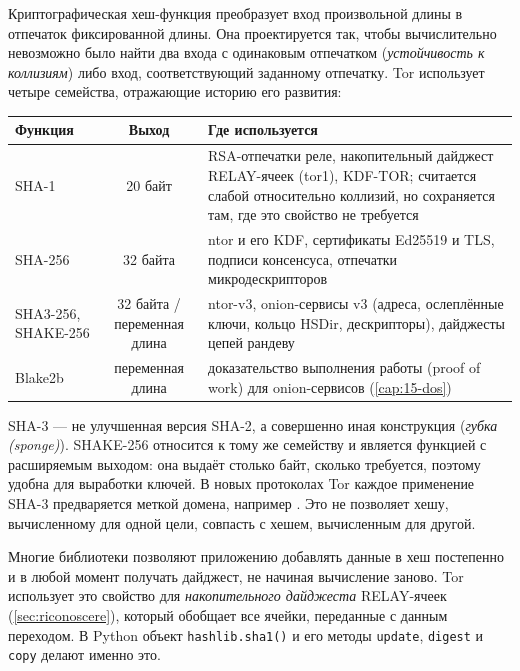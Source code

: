 Криптографическая хеш-функция преобразует вход произвольной длины в отпечаток фиксированной длины. Она проектируется так, чтобы вычислительно невозможно было найти два входа с одинаковым отпечатком (\emph{устойчивость к коллизиям}) либо вход, соответствующий заданному отпечатку. Tor использует четыре семейства, отражающие историю его развития:
\begin{center}\small
\begin{tabularx}{\textwidth}{@{}l c >{\raggedright\arraybackslash}X@{}}
\toprule
Функция & Выход & Где используется \\
\midrule
SHA-1 & 20 байт & RSA-отпечатки реле, накопительный дайджест RELAY-ячеек (tor1), KDF-TOR; считается слабой относительно коллизий, но сохраняется там, где это свойство не требуется \\
SHA-256 & 32 байта & ntor и его KDF, сертификаты Ed25519 и TLS, подписи консенсуса, отпечатки микродескрипторов \\
SHA3-256, SHAKE-256 & 32 байта / переменная длина & ntor-v3, onion-сервисы v3 (адреса, ослеплённые ключи, кольцо HSDir, дескрипторы), дайджесты цепей рандеву \\
Blake2b & переменная длина & доказательство выполнения работы (proof of work) для onion-сервисов (\cref{cap:15-dos}) \\
\bottomrule
\end{tabularx}
\end{center}

SHA-3 --- не улучшенная версия SHA-2, а совершенно иная конструкция (\emph{губка (sponge)}). SHAKE-256 относится к тому же семейству и является функцией с расширяемым выходом: она выдаёт столько байт, сколько требуется, поэтому удобна для выработки ключей. В новых протоколах Tor каждое применение SHA-3 предваряется меткой домена, например . Это не позволяет хешу, вычисленному для одной цели, совпасть с хешем, вычисленным для другой.

\begin{approfondimento}
Многие библиотеки позволяют приложению добавлять данные в хеш постепенно и в любой момент получать дайджест, не начиная вычисление заново. Tor использует это свойство для \emph{накопительного дайджеста} RELAY-ячеек (\cref{sec:riconoscere}), который обобщает все ячейки, переданные с данным переходом. В Python объект \texttt{hashlib.sha1()} и его методы \texttt{update}, \texttt{digest} и \texttt{copy} делают именно это.
\end{approfondimento}

